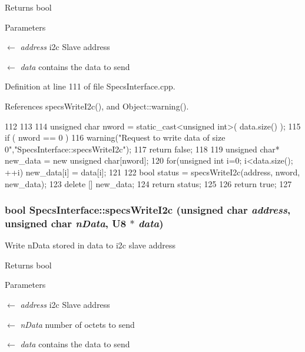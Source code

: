 \begin{DoxyReturn}{Returns}
bool 
\end{DoxyReturn}

\begin{DoxyParams}{Parameters}
\item[\mbox{$\leftarrow$} {\em address}]i2c Slave address \item[\mbox{$\leftarrow$} {\em data}]contains the data to send \end{DoxyParams}


Definition at line 111 of file SpecsInterface.cpp.

References specsWriteI2c(), and Object::warning().


\begin{DoxyCode}
112                                                       {
113 
114   unsigned char nword = static_cast<unsigned int>( data.size() );
115   if ( nword == 0 ) {
116     warning("Request to write data of size 0","SpecsInterface::specsWriteI2c");
117     return false;
118   }
119   unsigned char* new_data = new unsigned char[nword];
120   for(unsigned int i=0; i<data.size(); ++i) new_data[i] = data[i];
121  
122   bool status =     specsWriteI2c(address, nword, new_data);
123   delete [] new_data;
124   return status;
125 
126   return true;
127 }
\end{DoxyCode}
\hypertarget{classSpecsInterface_a20dacf68396a40eadbb740db73ff9624}{
\subsubsection[{specsWriteI2c}]{\setlength{\rightskip}{0pt plus 5cm}bool SpecsInterface::specsWriteI2c (unsigned char {\em address}, \/  unsigned char {\em nData}, \/  {\bf U8} $\ast$ {\em data})}}
\label{classSpecsInterface_a20dacf68396a40eadbb740db73ff9624}
Write nData stored in data to i2c slave address

\begin{DoxyReturn}{Returns}
bool 
\end{DoxyReturn}

\begin{DoxyParams}{Parameters}
\item[\mbox{$\leftarrow$} {\em address}]i2c Slave address \item[\mbox{$\leftarrow$} {\em nData}]number of octets to send \item[\mbox{$\leftarrow$} {\em data}]contains the data to send \end{DoxyParams}


